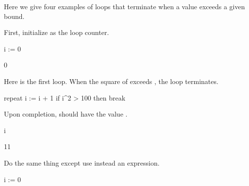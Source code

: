 {%

Here we give four examples of  loops that
terminate when a value exceeds a given bound.

\vskip 1pc
\begin{xtc}
\begin{xtccomment}
First, initialize  as the loop counter.
\end{xtccomment}
\begin{spadsrc}
i := 0 
\end{spadsrc}
\begin{TeXOutput}
\begin{fricasmath}{1}
0%
\end{fricasmath}
\end{TeXOutput}
\end{xtc}
\begin{xtc}
\begin{xtccomment}
Here is the first loop.
When the square of  exceeds , the loop terminates.
\end{xtccomment}
\begin{spadsrc}
repeat
  i := i + 1
  if i^2 > 100 then break
\end{spadsrc}
\end{xtc}
\begin{xtc}
\begin{xtccomment}
Upon completion,  should have the value .
\end{xtccomment}
\begin{spadsrc}
i 
\end{spadsrc}
\begin{TeXOutput}
\begin{fricasmath}{3}
11%
\end{fricasmath}
\end{TeXOutput}
\end{xtc}
%
%
\begin{xtc}
\begin{xtccomment}
Do the same thing except use \spadSyntax{=>} instead
an  expression.
\end{xtccomment}
\begin{spadsrc}
i := 0 
\end{spadsrc}
\begin{TeXOutput}

\end{TeXOutput}
\end{xtc}}
